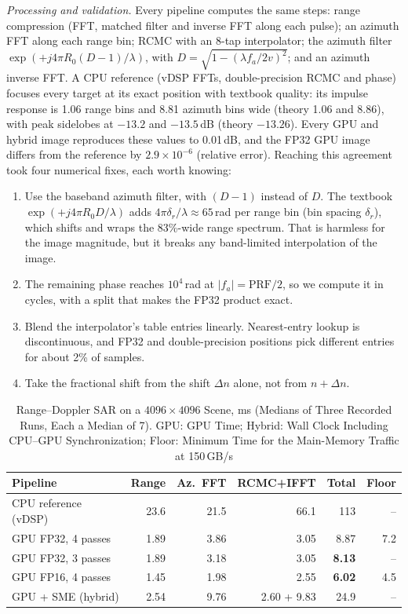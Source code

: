 \documentclass[conference]{IEEEtran}
\begin{document}
\textit{Processing and validation.} Every pipeline computes the same steps: range compression (FFT,
matched filter and inverse FFT along each pulse); an azimuth FFT along each range bin; RCMC with an
8-tap interpolator; the azimuth filter $\exp(+j4\pi R_0(D-1)/\lambda)$, with
$D=\sqrt{1-(\lambda f_a/2v)^2}$; and an azimuth inverse FFT. A CPU reference (vDSP FFTs,
double-precision RCMC and phase) focuses every target at its exact position with textbook quality: its
impulse response is 1.06 range bins and 8.81 azimuth bins wide (theory 1.06 and 8.86), with peak
sidelobes at $-13.2$ and $-13.5$\,dB (theory $-13.26$). Every GPU and hybrid image reproduces these values
to 0.01\,dB, and the FP32 GPU image differs from the reference by $2.9\times10^{-6}$ (relative error).
Reaching this agreement took four numerical fixes, each worth knowing:
\begin{enumerate}
\item Use the baseband azimuth filter, with $(D-1)$ instead of $D$. The textbook
  $\exp(+j4\pi R_0D/\lambda)$ adds $4\pi\delta_r/\lambda\approx65$\,rad per range bin (bin spacing
  $\delta_r$), which shifts and wraps the 83\%-wide range spectrum. That is harmless for the image
  magnitude, but it breaks any band-limited interpolation of the image.
\item The remaining phase reaches $10^4$\,rad at $|f_a|=\mathrm{PRF}/2$, so we compute it in cycles, with
  a split that makes the FP32 product exact.
\item Blend the interpolator's table entries linearly. Nearest-entry lookup is discontinuous, and FP32
  and double-precision positions pick different entries for about 2\% of samples.
\item Take the fractional shift from the shift $\Delta n$ alone, not from $n+\Delta n$.
\end{enumerate}

\begin{table}[t]
\centering
\caption{Range--Doppler SAR on a $4096\times4096$ Scene, ms (Medians of Three Recorded Runs, Each a
Median of 7). GPU: GPU Time; Hybrid: Wall Clock Including CPU--GPU Synchronization; Floor: Minimum Time
for the Main-Memory Traffic at 150\,GB/s}
\label{tab:sar}
\footnotesize
\setlength{\tabcolsep}{3pt}
\begin{tabular}{@{}lrrrrr@{}}
\toprule
\textbf{Pipeline} & \textbf{Range} & \textbf{Az.\ FFT} & \textbf{RCMC+IFFT} & \textbf{Total} & \textbf{Floor} \\
\midrule
CPU reference (vDSP) & 23.6 & 21.5 & 66.1 & 113 & -- \\
GPU FP32, 4 passes & 1.89 & 3.86 & 3.05 & 8.87 & 7.2 \\
GPU FP32, 3 passes & 1.89 & 3.18 & 3.05 & \textbf{8.13} & -- \\
GPU FP16, 4 passes & 1.45 & 1.98 & 2.55 & \textbf{6.02} & 4.5 \\
GPU + SME (hybrid) & 2.54 & 9.76 & 2.60 + 9.83 & 24.9 & -- \\
\bottomrule
\end{tabular}
\end{table}
\end{document}
